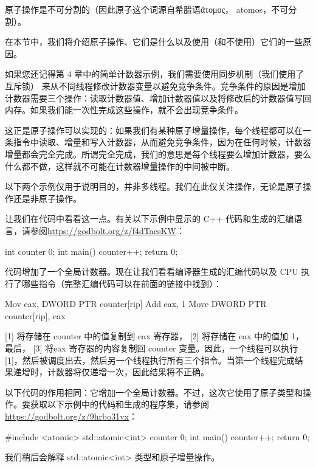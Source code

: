 
原子操作是不可分割的（因此原子这个词源自希腊语ἄτομος， atomos，不可分割）。

在本节中，我们将介绍原子操作、它们是什么以及使用（和不使用）它们的一些原因。


如果您还记得第 4 章中的简单计数器示例，我们需要使用同步机制（我们使用了互斥锁） 来从不同线程修改计数器变量以避免竞争条件。竞争条件的原因是增加计数器需要三个操作：读取计数器值、增加计数器值以及将修改后的计数器值写回内存。如果我们能一次性完成这些操作，就不会出现竞争条件。

这正是原子操作可以实现的：如果我们有某种原子增量操作，每个线程都可以在一条指令中读取、增量和写入计数器，从而避免竞争条件，因为在任何时候，计数器增量都会完全完成。所谓完全完成，我们的意思是每个线程要么增加计数器，要么什么都不做，这样就不可能在计数器增量操作的中间被中断。

以下两个示例仅用于说明目的，并非多线程。我们在此仅关注操作，无论是原子操作还是非原子操作。

让我们在代码中看看这一点。有关以下示例中显示的 C++ 代码和生成的汇编语言，请参阅\url{https://godbolt.org/z/f4dTacsKW}：

\begin{cpp}
int counter {0};
int main() {
    counter++;
    return 0;
}
\end{cpp}

代码增加了一个全局计数器。现在让我们看看编译器生成的汇编代码以及 CPU 执行了哪些指令（完整汇编代码可以在前面的链接中找到）：

\begin{cpp}
Mov eax, DWORD PTR counter[rip]
Add eax, 1
Move DWORD PTR counter[rip], eax
\end{cpp}

[1] 将存储在 counter 中的值复制到 eax 寄存器， [2] 将存储在 eax 中的值加 1，最后， [3] 将eax 寄存器的内容复制回 counter 变量。因此，一个线程可以执行 [1]，然后被调度出去，然后另一个线程执行所有三个指令。当第一个线程完成结果递增时，计数器将仅递增一次，因此结果将不正确。

以下代码的作用相同：它增加一个全局计数器。不过，这次它使用了原子类型和操作。要获取以下示例中的代码和生成的程序集，请参阅 \url{https://godbolt.org/z/9hrbo31vx}：

\begin{cpp}
#include <atomic>
std::atomic<int> counter {0};
int main() {
    counter++;
    return 0;
}
\end{cpp}

我们稍后会解释 std::atomic<int> 类型和原子增量操作。


